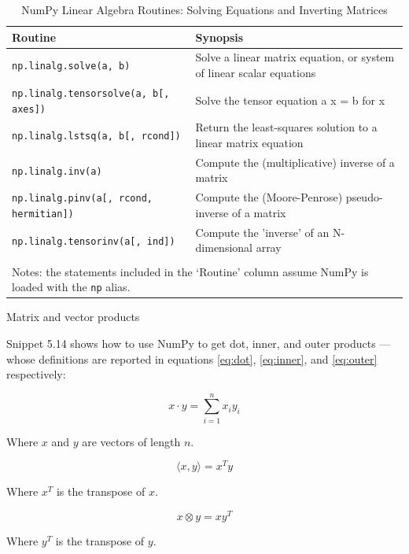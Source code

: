 \documentclass[a4paper,11pt]{book}
\newcommand{\question}[1]{%
    \begin{tcolorbox}[colback=comp_c!10,colframe=comp_c,sidebyside align=top,width=\linewidth,before skip=1ex]
        #1
    \end{tcolorbox}
    \switchcolumn%
}
\newcommand{\note}[1]{%
    \begin{tcolorbox}[colback=white!0,colframe=white!10,width=\linewidth,before skip=1ex]
        #1
    \end{tcolorbox}
}
\begin{document}
\begin{table}
	\centering
	\caption{NumPy Linear Algebra Routines: Solving Equations and Inverting Matrices} 
	\label{tab:solving_equations}
	\begin{tabular}{ll}
		\toprule \toprule
			Routine & Synopsis \\
			\midrule
                        \texttt{np.linalg.solve(a, b)} &
                        Solve a linear matrix equation, or system of linear scalar equations\\
                        \texttt{np.linalg.tensorsolve(a, b[, axes])} &
                        Solve the tensor equation a x = b for x\\
                        \texttt{np.linalg.lstsq(a, b[, rcond])} &
                        Return the least-squares solution to a linear matrix equation\\
                        \texttt{np.linalg.inv(a)} &
                        Compute the (multiplicative) inverse of a matrix\\
                        \texttt{np.linalg.pinv(a[, rcond, hermitian])} &
                        Compute the (Moore-Penrose) pseudo-inverse of a matrix\\
                        \texttt{np.linalg.tensorinv(a[, ind])} &
                        Compute the 'inverse' of an N-dimensional array\\
	     	\bottomrule \\[-1.8ex]
	        \multicolumn{2}{l}{Notes: the statements included in the `Routine' column assume NumPy is loaded with the \texttt{np} alias.} \\
	\end{tabular}
\end{table}
\clearpage

\begin{paracol}{2}
    \question{\raggedright Matrix and vector products}
    \note{Snippet 5.14 shows how to use NumPy to get dot, inner, and outer products --- whose definitions are reported in equations \ref{eq:dot}, \ref{eq:inner}, and \ref{eq:outer} respectively:
    
    \begin{equation}
	\label{eq:dot}
    	x \cdot y = \sum_{i=1}^n x_{i} y_{i} 
    \end{equation}

    Where $x$ and $y$ are vectors of length $n$. 

    \begin{equation}
	\label{eq:inner}
	\langle x, y\rangle = x^{T} y
    \end{equation}
    
    Where $x^{T}$ is the transpose of $x$. 
    
    \begin{equation}
	\label{eq:outer}
	x \otimes y = x y^{T}
    \end{equation}

    Where $y^{T}$ is the transpose of $y$.
    }
\end{paracol}
\end{document}
